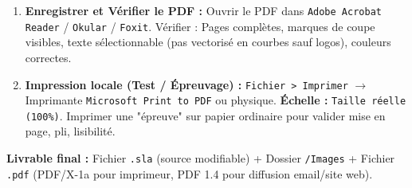 \documentclass[11pt]{article}
\begin{document}
\begin{methode}
\begin{enumerate}
\begin{itemize}
                  \item \textbf{Préréglage :} \texttt{PDF/X-1a:2001} (Standard imprimerie, tout en CMJN, polices embarquées, pas de transparence vive, pas de JS/Video) \textbf{OU} \texttt{PDF 1.4/1.5} (Généraliste, garde transparences, RVB possible pour diffusion web/email).
                  \item \textbf{Onglet Général :} Pages : \texttt{Toutes} / \texttt{Étendue}. \textbf{Décocher \texttt{Pages face à face}} pour PDF simple page (imprimeur préfère souvent pages simples + bords perdus). \textbf{Cocher :} \texttt{Inclure les bords perdus du document (Use Document Bleeds)}. \texttt{Marques de coupe (Crop marks)} : Oui, Décalage \textbf{3 mm} (doit être $\ge$ bord perdu).
                  \item \textbf{Onglet Polices :} \texttt{Intégrer toutes : OUI}. \texttt{Sous-ensemble (Subset) : OUI} (optimise taille fichier).
                  \item \textbf{Onglet Couleur :} \texttt{Sortie destinée à : Imprimante (CMJN)}. \texttt{Convertir les couleurs en : CMJN}. Profil : \texttt{ISO Coated v2 300\% (ECI)} (Standard Europe/Afrique francophone).
                  \item \textbf{Onglet Compression :} Images Couleur/Niveaux de gris : \texttt{Bicubique} / $300$ DPI / \texttt{Seuil 450 DPI}. Monochrome : $1200$ DPI. Qualité \texttt{Élevée / Maximum}.
              \end{itemize}
        \item \textbf{Enregistrer et Vérifier le PDF :} Ouvrir le PDF dans \texttt{Adobe Acrobat Reader} / \texttt{Okular} / \texttt{Foxit}. Vérifier : Pages complètes, marques de coupe visibles, texte sélectionnable (pas vectorisé en courbes sauf logos), couleurs correctes.
        \item \textbf{Impression locale (Test / Épreuvage) :} \texttt{Fichier > Imprimer} $\rightarrow$ Imprimante \texttt{Microsoft Print to PDF} ou physique. \textbf{Échelle :} \texttt{Taille réelle (100\%)}. Imprimer une "épreuve" sur papier ordinaire pour valider mise en page, pli, lisibilité.
    \end{enumerate}
    \textbf{Livrable final :} Fichier \texttt{.sla} (source modifiable) + Dossier \texttt{/Images} + Fichier \texttt{.pdf} (PDF/X-1a pour imprimeur, PDF 1.4 pour diffusion email/site web).
\end{methode}
\end{document}
